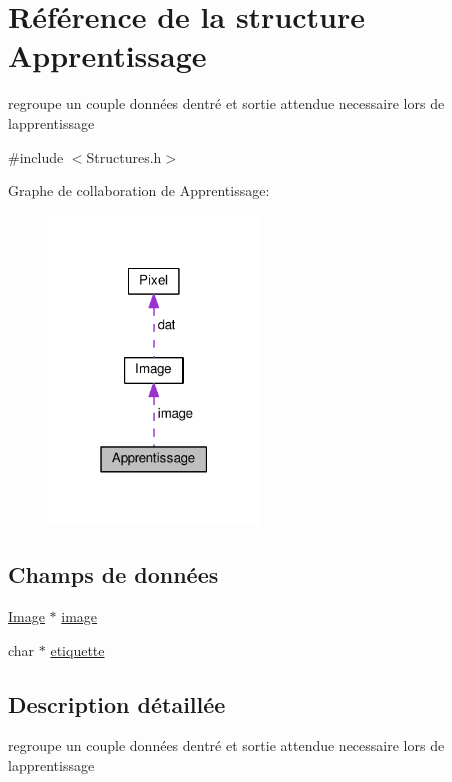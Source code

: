 \hypertarget{structApprentissage}{}\section{Référence de la structure Apprentissage}
\label{structApprentissage}


regroupe un couple données d\textquotesingle{}entré et sortie attendue necessaire lors de l\textquotesingle{}apprentissage  




{\ttfamily \#include $<$Structures.\+h$>$}



Graphe de collaboration de Apprentissage\+:\nopagebreak
\begin{figure}[H]
\begin{center}
\leavevmode
\includegraphics[width=159pt]{structApprentissage__coll__graph}
\end{center}
\end{figure}
\subsection*{Champs de données}
\begin{DoxyCompactItemize}
\item 
\hyperlink{structImage}{Image} $\ast$ \hyperlink{structApprentissage_af3defb9d6e44f5ca0fe145113cec1943}{image}
\item 
char $\ast$ \hyperlink{structApprentissage_af1668167b1678d621bb9b88573f55be7}{etiquette}
\end{DoxyCompactItemize}


\subsection{Description détaillée}
regroupe un couple données d\textquotesingle{}entré et sortie attendue necessaire lors de l\textquotesingle{}apprentissage 

